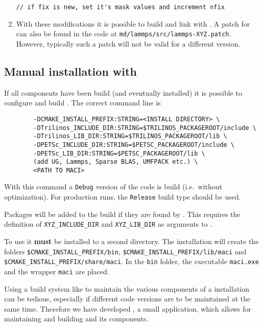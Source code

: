 \begin{enumerate}
\begin{lstlisting}[style=CODE_SMALL,frame=lines]
   // if fix is new, set it's mask values and increment nfix
\end{lstlisting}
\item With these modifications it is possible to build \LAMMPS and link with \MACI. A patch for \LAMMPS can also be found in the \MACI code at \lstinline[style=SHELL]|md/lammps/src/lammps-XYZ.patch|. However, typically such a patch will not be valid for a different \LAMMPS version.
\end{enumerate}

\subsection{Manual installation with \CMAKE}

If all components have been build (and eventually installed) it is possible to configure and build \MACI. The correct command line is

\begin{lstlisting}[style=SHELL]
% cmake -DBUILD_SHARED_LIBS:BOOL=ON -DCMAKE_BUILD_TYPE:STRING=Debug \
        -DCMAKE_INSTALL_PREFIX:STRING=<INSTALL DIRECTORY> \
        -DTrilinos_INCLUDE_DIR:STRING=$TRILINOS_PACKAGEROOT/include \
        -DTrilinos_LIB_DIR:STRING=$TRILINOS_PACKAGEROOT/lib \
        -DPETSc_INCLUDE_DIR:STRING=$PETSC_PACKAGEROOT/include \
        -DPETSc_LIB_DIR:STRING=$PETSC_PACKAGEROOT/lib \
        (add UG, Lammps, Sparse BLAS, UMFPACK etc.) \
        <PATH TO MACI>
\end{lstlisting}

With this command a \lstinline[style=SHELL]|Debug| version of the code is build (i.e.~without optimization). For production runs, the \lstinline[style=SHELL]|Release| build type should be used.

Packages will be added to the build if they are found by \CMAKE. This requires the definition of \lstinline[style=SHELL]|XYZ_INCLUDE_DIR| and \lstinline[style=SHELL]|XYZ_LIB_DIR| as arguments to \CMAKE.

To use \MACI it \textbf{must} be installed to a second directory. The installation will create the folders \lstinline[style=SHELL]|$CMAKE_INSTALL_PREFIX/bin|, \lstinline[style=SHELL]|$CMAKE_INSTALL_PREFIX/lib/maci| and \lstinline[style=SHELL]|$CMAKE_INSTALL_PREFIX/share/maci|. In the \lstinline[style=SHELL]|bin| folder, the executable \lstinline[style=SHELL]|maci.exe| and the wrapper \lstinline[style=SHELL]|maci| are placed.

Using a build system like \CMAKE to maintain the various components of a \MACI installation can be tedious, especially if different code versions are to be maintained at the same time. Therefore we have developed \BUILDPY, a small application, which allows for maintaining and building \MACI and its components.

